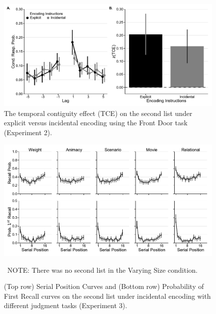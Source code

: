 \documentclass[man,natbib,floatsintext]{apa6} %
\begin{document}
\begin{figure}%
\includegraphics{figures/E2_crp_list2.pdf}
\caption{The temporal contiguity effect (TCE) on the second list under explicit versus incidental encoding using the Front Door task (Experiment 2). \paneltext}
\label{e2_l2_crp}
\end{figure}



\begin{figure}
\includegraphics{figures/E3_spc_list2.pdf}
\caption{(Top row) Serial Position Curves and (Bottom row) Probability of First Recall curves on the second list under incidental encoding with different judgment tasks (Experiment 3). \spcpaneltext}~NOTE: There was no second list in the Varying Size condition.
\label{e3_l2_spc}
\end{figure}
\end{document}
